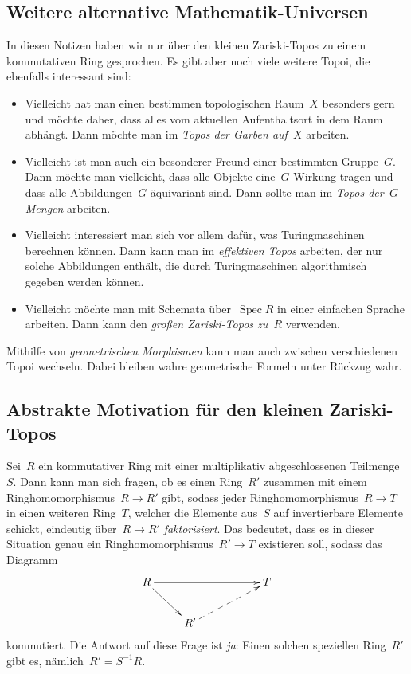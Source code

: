 \documentclass[a4paper,ngerman,12pt]{scrartcl}
\theoremstyle{definition}
\theoremstyle{plain}
\theoremstyle{remark}
\DeclareMathOperator{\Spec}{Spec}
\renewcommand{\_}{\mathpunct{.}\,}
\newcommand{\?}{\,{:}\,}
\begin{document}
\subsection*{Weitere alternative Mathematik-Universen}

In diesen Notizen haben wir nur über den kleinen Zariski-Topos zu einem
kommutativen Ring gesprochen. Es gibt aber noch viele weitere Topoi, die
ebenfalls interessant sind:
\begin{itemize}
\item Vielleicht hat man einen bestimmen topologischen Raum~$X$ besonders gern
und möchte daher, dass alles vom aktuellen Aufenthaltsort
in dem Raum abhängt. Dann möchte man im \emph{Topos der Garben auf~$X$}
arbeiten.
\item Vielleicht ist man auch ein besonderer Freund einer bestimmten
Gruppe~$G$. Dann möchte man vielleicht, dass alle Objekte
eine~$G$-Wirkung tragen und dass alle Abbildungen~$G$-äquivariant
sind. Dann sollte man im \emph{Topos der~$G$-Mengen} arbeiten.
\item Vielleicht interessiert man sich vor allem dafür, was Turingmaschinen
berechnen können. Dann kann man im \emph{effektiven Topos} arbeiten, der nur
solche Abbildungen enthält, die durch Turingmaschinen algorithmisch gegeben
werden können.
\item Vielleicht möchte man mit Schemata über~$\Spec R$ in einer einfachen
Sprache arbeiten. Dann kann den \emph{großen Zariski-Topos zu~$R$} verwenden.
\end{itemize}

Mithilfe von \emph{geometrischen Morphismen} kann man auch zwischen
verschiedenen Topoi wechseln. Dabei bleiben wahre geometrische Formeln unter
Rückzug wahr.


\subsection*{Abstrakte Motivation für den kleinen Zariski-Topos}

Sei~$R$ ein kommutativer Ring mit einer multiplikativ abgeschlossenen
Teilmenge~$S$. Dann kann man sich fragen, ob es einen Ring~$R'$ zusammen mit einem
Ringhomomorphismus~$R \to R'$ gibt, sodass jeder Ringhomomorphismus~$R \to T$
in einen weiteren Ring~$T$, welcher die Elemente aus~$S$ auf
invertierbare Elemente schickt, eindeutig über~$R \to R'$ \emph{faktorisiert}.
Das bedeutet, dass es in dieser Situation genau ein Ringhomomorphismus~$R' \to
T$ existieren soll, sodass das Diagramm
\[ \xymatrix{
  R \ar[rd] \ar[rrr] &&& T \\
  & R' \ar@{-->}[rru]
} \]
kommutiert. Die Antwort auf diese Frage ist \emph{ja}: Einen solchen speziellen
Ring~$R'$ gibt es, nämlich~$R' = S^{-1}R$.
\end{document}
